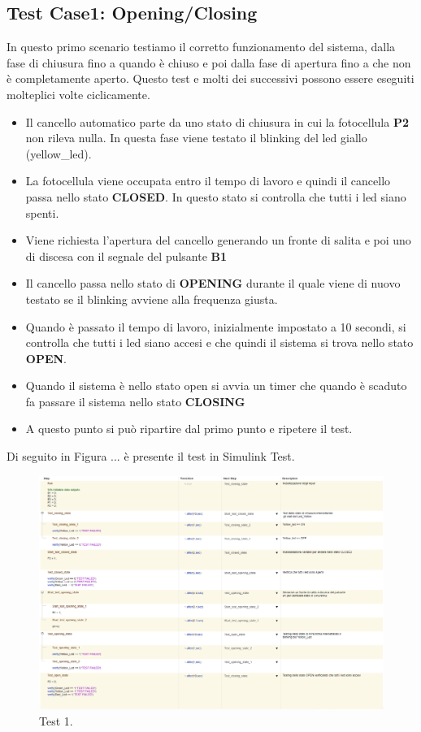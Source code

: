 \documentclass[12pt]{article}
\begin{document}
\subsection{Test Case1: Opening/Closing}
In questo primo scenario testiamo il corretto funzionamento del sistema, dalla fase di chiusura fino a quando è chiuso e poi dalla fase di apertura fino a che non è completamente aperto. Questo test e molti dei successivi possono essere eseguiti molteplici volte ciclicamente.

\begin{itemize}
    \item Il cancello automatico parte da uno stato di chiusura in cui la fotocellula \textbf{P2} non rileva nulla. In questa fase viene testato il blinking del led giallo (yellow\_led).
    \item La fotocellula viene occupata entro il tempo di lavoro e quindi il cancello passa nello stato \textbf{CLOSED}. In questo stato si controlla che tutti i led siano spenti.
    \item Viene richiesta l'apertura del cancello generando un fronte di salita e poi uno di discesa con il segnale del pulsante \textbf{B1}
    \item Il cancello passa nello stato di \textbf{OPENING} durante il quale viene di nuovo testato se il blinking avviene alla frequenza giusta.
    \item Quando è passato il tempo di lavoro, inizialmente impostato a 10 secondi, si controlla che tutti i led siano accesi e che quindi il sistema si trova nello stato \textbf{OPEN}.
    \item Quando il sistema è nello stato open si avvia un timer che quando è scaduto fa passare il sistema nello stato \textbf{CLOSING}
    \item A questo punto si può ripartire dal primo punto e ripetere il test.
\end{itemize}

Di seguito in Figura ... è presente il test in Simulink Test.

\begin{figure}[H]
    
    \hspace{-2.3cm} %
    \includegraphics[width=1.3\textwidth]{Immagini_Test/Test_1_img.PNG}
    \caption{Test 1.}
    \label{fig:Test_1}
\end{figure}
\end{document}
